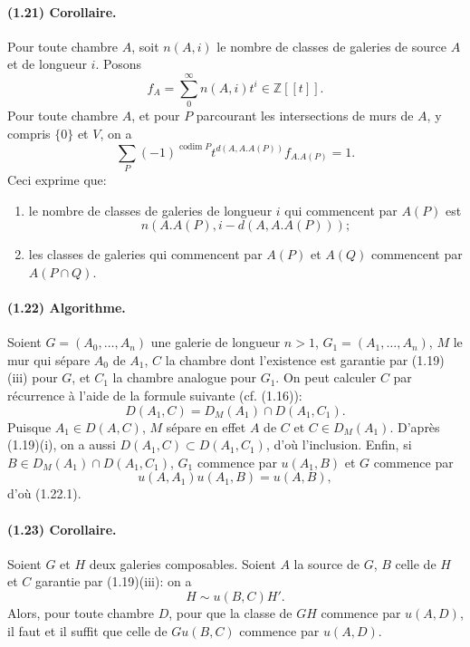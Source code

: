 \documentclass[10pt]{article}
\newcommand{\Z}{\mathbb Z}
\newcommand{\codim}{\operatorname{codim}}
\begin{document}
\paragraph{(1.21) Corollaire.} Pour toute chambre $A$, soit $n(A,i)$ le nombre de classes de galeries de source $A$ et de longueur $i$. Posons
\[
f_A=\sum_{0}^{\infty}n(A,i)t^i\in\Z[[t]].
\]
Pour toute chambre $A$, et pour $P$ parcourant les intersections de murs de $A$, y compris $\{0\}$ et $V$, on a
\[
\sum_P (-1)^{\codim P}t^{d(A,A.A(P))}f_{A.A(P)}=1.
\]
Ceci exprime que:
\begin{enumerate}[label=\alph*)]
\item le nombre de classes de galeries de longueur $i$ qui commencent par $A(P)$ est
\[
n(A.A(P),i-d(A,A.A(P)));
\]
\item les classes de galeries qui commencent par $A(P)$ et $A(Q)$ commencent par $A(P\cap Q)$.
\end{enumerate}

\paragraph{(1.22) Algorithme.} Soient $G=(A_0,\ldots,A_n)$ une galerie de longueur $n>1$, $G_1=(A_1,\ldots,A_n)$, $M$ le mur qui sépare $A_0$ de $A_1$, $C$ la chambre dont l'existence est garantie par (1.19)(iii) pour $G$, et $C_1$ la chambre analogue pour $G_1$. On peut calculer $C$ par récurrence à l'aide de la formule suivante (cf. (1.16)):
\[
\tag{1.22.1}
D(A_1,C)=D_M(A_1)\cap D(A_1,C_1).
\]
Puisque $A_1\in D(A,C)$, $M$ sépare en effet $A$ de $C$ et $C\in D_M(A_1)$. D'après (1.19)(i), on a aussi $D(A_1,C)\subset D(A_1,C_1)$, d'où l'inclusion. Enfin, si $B\in D_M(A_1)\cap D(A_1,C_1)$, $G_1$ commence par $u(A_1,B)$ et $G$ commence par
\[
u(A,A_1)u(A_1,B)=u(A,B),
\]
d'où (1.22.1).

\paragraph{(1.23) Corollaire.} Soient $G$ et $H$ deux galeries composables. Soient $A$ la source de $G$, $B$ celle de $H$ et $C$ garantie par (1.19)(iii): on a
\[
H\sim u(B,C)H'.
\]
Alors, pour toute chambre $D$, pour que la classe de $GH$ commence par $u(A,D)$, il faut et il suffit que celle de $Gu(B,C)$ commence par $u(A,D)$.
\end{document}
